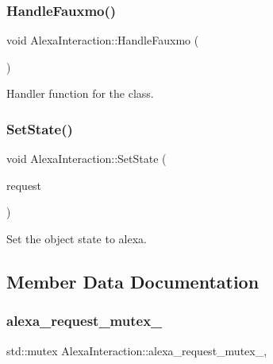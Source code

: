 \subsubsection{\texorpdfstring{Handle\+Fauxmo()}{HandleFauxmo()}}
{\footnotesize\ttfamily void Alexa\+Interaction\+::\+Handle\+Fauxmo (\begin{DoxyParamCaption}{ }\end{DoxyParamCaption})}



Handler function for the class. 

\mbox{\label{classAlexaInteraction_a223ede390439dbf2e1cecb925dc5b983}} 
\subsubsection{\texorpdfstring{Set\+State()}{SetState()}}
{\footnotesize\ttfamily void Alexa\+Interaction\+::\+Set\+State (\begin{DoxyParamCaption}\item[{\hyperlink{structCONFIG__SET_1_1MOTION__REQUEST}{C\+O\+N\+F\+I\+G\+\_\+\+S\+E\+T\+::\+M\+O\+T\+I\+O\+N\+\_\+\+R\+E\+Q\+U\+E\+ST}}]{request }\end{DoxyParamCaption})}



Set the object state to alexa. 



\subsection{Member Data Documentation}
\mbox{\label{classAlexaInteraction_a958fffc5a4f26ea4b0d0e1c12f4392fd}} 
\subsubsection{\texorpdfstring{alexa\+\_\+request\+\_\+mutex\+\_\+}{alexa\_request\_mutex\_}}
{\footnotesize\ttfamily std\+::mutex Alexa\+Interaction\+::alexa\+\_\+request\+\_\+mutex\+\_\+\hspace{0.3cm}{\ttfamily [static]}, {\ttfamily [private]}}

